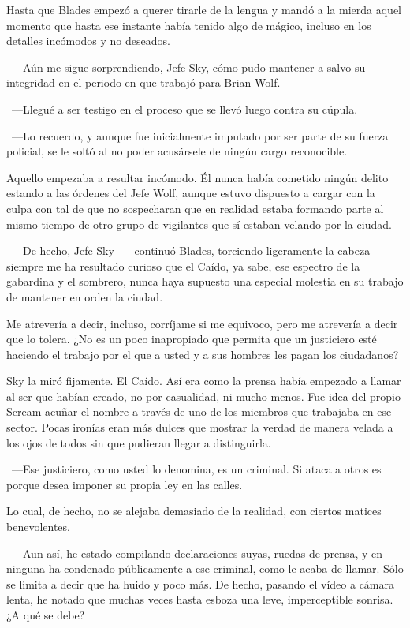 Hasta que Blades empezó a querer tirarle de la lengua y mandó a la mierda aquel momento que hasta ese instante había tenido algo de mágico, incluso en los detalles incómodos y no deseados.

~---Aún me sigue sorprendiendo, Jefe Sky, cómo pudo mantener a salvo su integridad en el periodo en que trabajó para Brian Wolf.

~---Llegué a ser testigo en el proceso que se llevó luego contra su cúpula.

~---Lo recuerdo, y aunque fue inicialmente imputado por ser parte de su fuerza policial, se le soltó al no poder acusársele de ningún cargo reconocible.

Aquello empezaba a resultar incómodo. Él nunca había cometido ningún delito estando a las órdenes del Jefe Wolf, aunque estuvo dispuesto a cargar con la culpa con tal de que no sospecharan que en realidad estaba formando parte al mismo tiempo de otro grupo de vigilantes que sí estaban velando por la ciudad.

~---De hecho, Jefe Sky ~---continuó Blades, torciendo ligeramente la cabeza~--- siempre me ha resultado curioso que el Caído, ya sabe, ese espectro de la gabardina y el sombrero, nunca haya supuesto una especial molestia en su trabajo de mantener en orden la ciudad.

\rquoti{}Me atrevería a decir, incluso, corríjame si me equivoco, pero me atrevería a decir que lo tolera. ¿No es un poco inapropiado que permita que un justiciero esté haciendo el trabajo por el que a usted y a sus hombres les pagan los ciudadanos?

Sky la miró fijamente. El Caído. Así era como la prensa había empezado a llamar al ser que habían creado, no por casualidad, ni mucho menos. Fue idea del propio Scream acuñar el nombre a través de uno de los miembros que trabajaba en ese sector. Pocas ironías eran más dulces que mostrar la verdad de manera velada a los ojos de todos sin que pudieran llegar a distinguirla.

~---Ese justiciero, como usted lo denomina, es un criminal. Si ataca a otros es porque desea imponer su propia ley en las calles.

Lo cual, de hecho, no se alejaba demasiado de la realidad, con ciertos matices benevolentes.

~---Aun así, he estado compilando declaraciones suyas, ruedas de prensa, y en ninguna ha condenado públicamente a ese criminal, como le acaba de llamar. Sólo se limita a decir que ha huido y poco más. De hecho, pasando el vídeo a cámara lenta, he notado que muchas veces hasta esboza una leve, imperceptible sonrisa. ¿A qué se debe?

